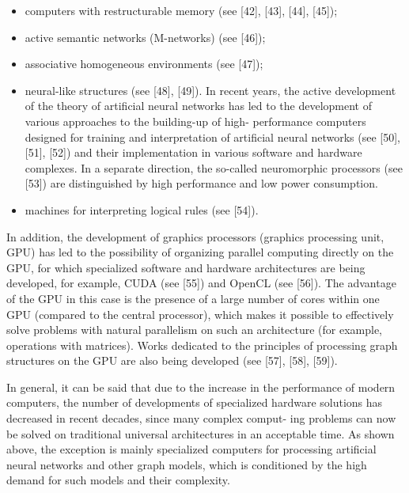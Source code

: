 \documentclass{article}
\begin{document}
\begin{multicols}{2}
\begin{itemize}
    \item computers with restructurable memory (see [42], [43], [44], [45]);
    \item active semantic networks (M-networks) (see [46]);
    \item associative homogeneous environments (see [47]);
    \item neural-like structures (see [48], [49]). In recent
years, the active development of the theory of artificial neural networks has led to the development of various approaches to the building-up of high- performance computers designed for training and interpretation of artificial neural networks (see [50], [51], [52]) and their implementation in various software and hardware complexes. In a separate direction, the so-called neuromorphic processors (see [53]) are distinguished by high performance and low power consumption.
    \item machines for interpreting logical rules (see [54]).
\end{itemize}
\par In addition, the development of graphics processors (graphics processing unit, GPU) has led to the possibility of organizing parallel computing directly on the GPU, for which specialized software and hardware architectures are being developed, for example, CUDA (see [55]) and OpenCL (see [56]). The advantage of the GPU in this case is the presence of a large number of cores within one GPU (compared to the central processor), which makes it possible to effectively solve problems with natural parallelism on such an architecture (for example, operations with matrices). Works dedicated to the principles of processing graph structures on the GPU are also being developed (see [57], [58], [59]).
\par In general, it can be said that due to the increase in the performance of modern computers, the number of developments of specialized hardware solutions has
decreased in recent decades, since many complex comput- ing problems can now be solved on traditional universal architectures in an acceptable time. As shown above, the exception is mainly specialized computers for processing artificial neural networks and other graph models, which is conditioned by the high demand for such models and their complexity.

\end{multicols}
\end{document}
